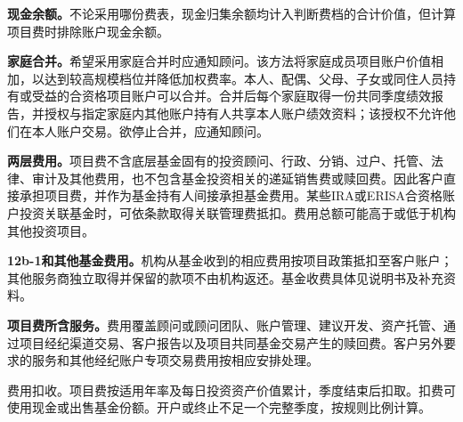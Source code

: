 \documentclass[UTF8,fontset=none,11pt,a4paper]{ctexart}
\begin{document}
\textbf{现金余额。}不论采用哪份费表，现金归集余额均计入判断费档的合计价值，但计算项目费时排除账户现金余额。


\textbf{家庭合并。}希望采用家庭合并时应通知顾问。该方法将家庭成员项目账户价值相加，以达到较高规模档位并降低加权费率。本人、配偶、父母、子女或同住人员持有或受益的合资格项目账户可以合并。合并后每个家庭取得一份共同季度绩效报告，并授权与指定家庭内其他账户持有人共享本人账户绩效资料；该授权不允许他们在本人账户交易。欲停止合并，应通知顾问。


\textbf{两层费用。}项目费不含底层基金固有的投资顾问、行政、分销、过户、托管、法律、审计及其他费用，也不包含基金投资相关的递延销售费或赎回费。因此客户直接承担项目费，并作为基金持有人间接承担基金费用。某些IRA或ERISA合资格账户投资关联基金时，可依条款取得关联管理费抵扣。费用总额可能高于或低于机构其他投资项目。


\textbf{12b-1和其他基金费用。}机构从基金收到的相应费用按项目政策抵扣至客户账户；其他服务商独立取得并保留的款项不由机构返还。基金收费具体见说明书及补充资料。


\textbf{项目费所含服务。}费用覆盖顾问或顾问团队、账户管理、建议开发、资产托管、通过项目经纪渠道交易、客户报告以及项目共同基金交易产生的赎回费。客户另外要求的服务和其他经纪账户专项交易费用按相应安排处理。


费用扣收。项目费按适用年率及每日投资资产价值累计，季度结束后扣取。扣费可使用现金或出售基金份额。开户或终止不足一个完整季度，按规则比例计算。
\end{document}

